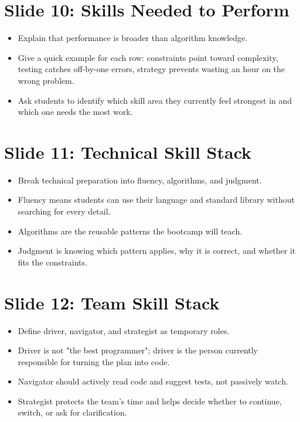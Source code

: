\documentclass[11pt]{article}
\begin{document}
\section*{Slide 10: Skills Needed to Perform}
\begin{itemize}
  \item Explain that performance is broader than algorithm knowledge.
  \item Give a quick example for each row: constraints point toward complexity, testing catches off-by-one errors, strategy prevents wasting an hour on the wrong problem.
  \item Ask students to identify which skill area they currently feel strongest in and which one needs the most work.
\end{itemize}

\section*{Slide 11: Technical Skill Stack}
\begin{itemize}
  \item Break technical preparation into fluency, algorithms, and judgment.
  \item Fluency means students can use their language and standard library without searching for every detail.
  \item Algorithms are the reusable patterns the bootcamp will teach.
  \item Judgment is knowing which pattern applies, why it is correct, and whether it fits the constraints.
\end{itemize}

\section*{Slide 12: Team Skill Stack}
\begin{itemize}
  \item Define driver, navigator, and strategist as temporary roles.
  \item Driver is not "the best programmer"; driver is the person currently responsible for turning the plan into code.
  \item Navigator should actively read code and suggest tests, not passively watch.
  \item Strategist protects the team's time and helps decide whether to continue, switch, or ask for clarification.
\end{itemize}
\end{document}
